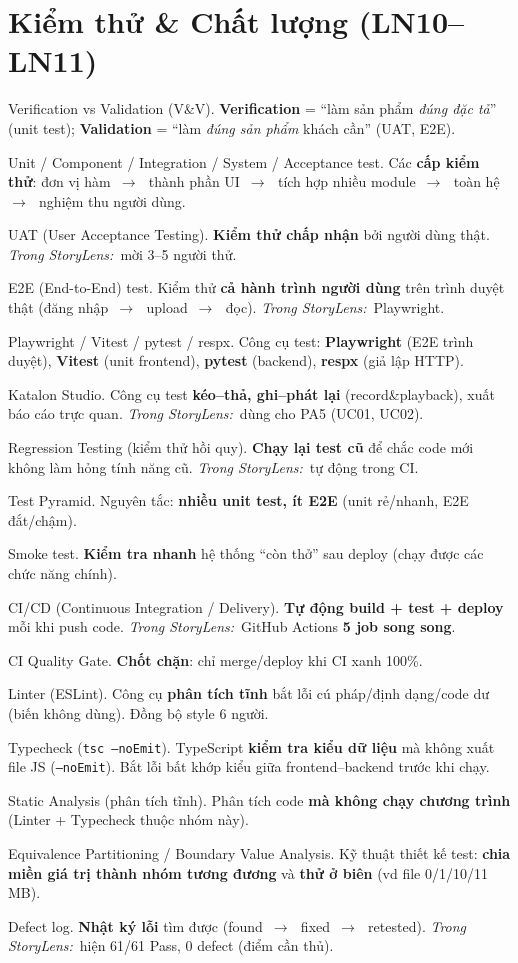 \documentclass[11pt]{article}
\newcommand{\arr}{\,\ensuremath{\rightarrow}\,}
\newcommand{\code}[1]{\texttt{\small #1}}
\newcommand{\insl}{\textit{\textcolor{steel}{Trong StoryLens:}}\ }
\begin{document}
\section{Kiểm thử \& Chất lượng (LN10--LN11)}
\begin{terms}
\item[Verification vs Validation (V\&V).] \textbf{Verification} = ``làm sản phẩm \textit{đúng đặc tả}'' (unit test); \textbf{Validation} = ``làm \textit{đúng sản phẩm} khách cần'' (UAT, E2E).
\item[Unit / Component / Integration / System / Acceptance test.] Các \textbf{cấp kiểm thử}: đơn vị hàm \arr\ thành phần UI \arr\ tích hợp nhiều module \arr\ toàn hệ \arr\ nghiệm thu người dùng.
\item[UAT (User Acceptance Testing).] \textbf{Kiểm thử chấp nhận} bởi người dùng thật. \insl mời 3--5 người thử.
\item[E2E (End-to-End) test.] Kiểm thử \textbf{cả hành trình người dùng} trên trình duyệt thật (đăng nhập \arr\ upload \arr\ đọc). \insl Playwright.
\item[Playwright / Vitest / pytest / respx.] Công cụ test: \textbf{Playwright} (E2E trình duyệt), \textbf{Vitest} (unit frontend), \textbf{pytest} (backend), \textbf{respx} (giả lập HTTP).
\item[Katalon Studio.] Công cụ test \textbf{kéo--thả, ghi--phát lại} (record\&playback), xuất báo cáo trực quan. \insl dùng cho PA5 (UC01, UC02).
\item[Regression Testing (kiểm thử hồi quy).] \textbf{Chạy lại test cũ} để chắc code mới không làm hỏng tính năng cũ. \insl tự động trong CI.
\item[Test Pyramid.] Nguyên tắc: \textbf{nhiều unit test, ít E2E} (unit rẻ/nhanh, E2E đắt/chậm).
\item[Smoke test.] \textbf{Kiểm tra nhanh} hệ thống ``còn thở'' sau deploy (chạy được các chức năng chính).
\item[CI/CD (Continuous Integration / Delivery).] \textbf{Tự động build + test + deploy} mỗi khi push code. \insl GitHub Actions \textbf{5 job song song}.
\item[CI Quality Gate.] \textbf{Chốt chặn}: chỉ merge/deploy khi CI xanh 100\%.
\item[Linter (ESLint).] Công cụ \textbf{phân tích tĩnh} bắt lỗi cú pháp/định dạng/code dư (biến không dùng). Đồng bộ style 6 người.
\item[Typecheck (\code{tsc --noEmit}).] TypeScript \textbf{kiểm tra kiểu dữ liệu} mà không xuất file JS (\code{--noEmit}). Bắt lỗi bất khớp kiểu giữa frontend--backend trước khi chạy.
\item[Static Analysis (phân tích tĩnh).] Phân tích code \textbf{mà không chạy chương trình} (Linter + Typecheck thuộc nhóm này).
\item[Equivalence Partitioning / Boundary Value Analysis.] Kỹ thuật thiết kế test: \textbf{chia miền giá trị thành nhóm tương đương} và \textbf{thử ở biên} (vd file 0/1/10/11 MB).
\item[Defect log.] \textbf{Nhật ký lỗi} tìm được (found \arr\ fixed \arr\ retested). \insl hiện 61/61 Pass, 0 defect (điểm cần thủ).
\end{terms}
\end{document}
